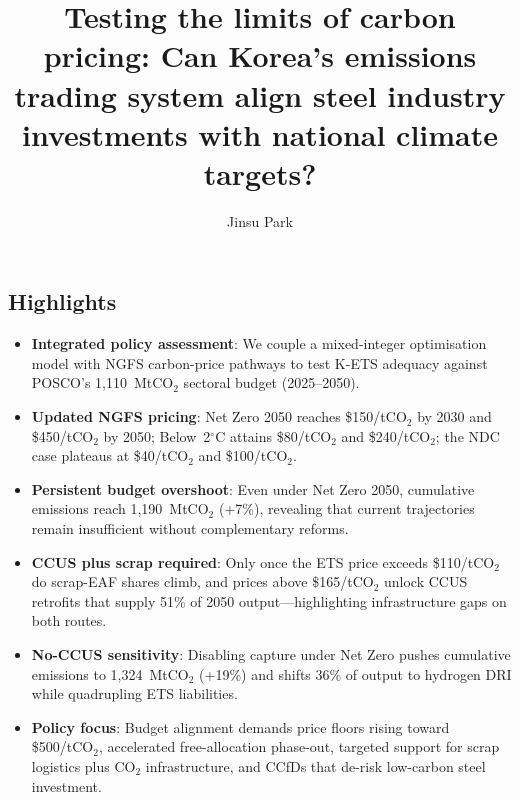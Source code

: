 \documentclass[preprint,1p,authoryear]{elsarticle}
\begin{document}
\begin{frontmatter}
\title{Testing the limits of carbon pricing: Can Korea's emissions trading system align steel industry investments with national climate targets?}

\author[planit]{Jinsu Park}
\address[planit]{PLANiT Institute, Seoul, Republic of Korea}


\section*{Highlights}
\begin{itemize}[leftmargin=*]
  \item \textbf{Integrated policy assessment}: We couple a mixed-integer optimisation model with NGFS carbon-price pathways to test K-ETS adequacy against POSCO's 1,110~MtCO$_2$ sectoral budget (2025--2050).
  \item \textbf{Updated NGFS pricing}: Net Zero 2050 reaches \$150/tCO$_2$ by 2030 and \$450/tCO$_2$ by 2050; Below~2$^\circ$C attains \$80/tCO$_2$ and \$240/tCO$_2$; the NDC case plateaus at \$40/tCO$_2$ and \$100/tCO$_2$.
  \item \textbf{Persistent budget overshoot}: Even under Net Zero 2050, cumulative emissions reach 1,190~MtCO$_2$ (+7\%), revealing that current trajectories remain insufficient without complementary reforms.
  \item \textbf{CCUS plus scrap required}: Only once the ETS price exceeds \$110/tCO$_2$ do scrap-EAF shares climb, and prices above \$165/tCO$_2$ unlock CCUS retrofits that supply 51\% of 2050 output—highlighting infrastructure gaps on both routes.
  \item \textbf{No-CCUS sensitivity}: Disabling capture under Net Zero pushes cumulative emissions to 1,324~MtCO$_2$ (+19\%) and shifts 36\% of output to hydrogen DRI while quadrupling ETS liabilities.
  \item \textbf{Policy focus}: Budget alignment demands price floors rising toward \$500/tCO$_2$, accelerated free-allocation phase-out, targeted support for scrap logistics plus CO$_2$ infrastructure, and CCfDs that de-risk low-carbon steel investment.
\end{itemize}


\end{frontmatter}
\end{document}
